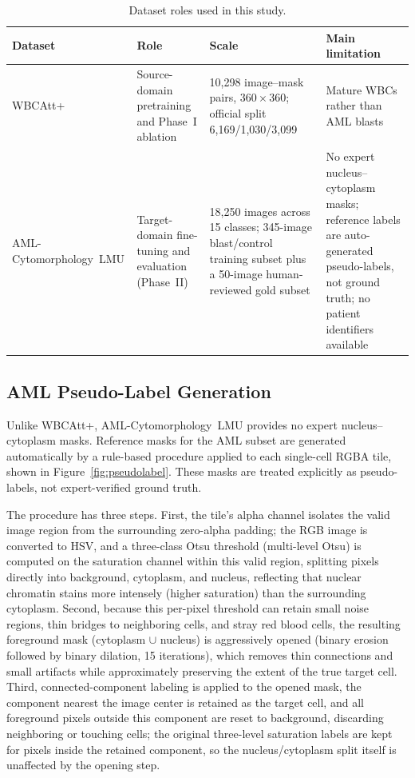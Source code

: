 \documentclass[pdflatex,sn-mathphys-num]{sn-jnl}%
\theoremstyle{thmstyleone}%
\theoremstyle{thmstyletwo}%
\theoremstyle{thmstylethree}%
\begin{document}
\begin{table}[t]
\caption{Dataset roles used in this study.}
\label{tab:datasets}
\centering
\begin{tabular}{p{2.6cm}p{3.0cm}p{4.3cm}p{5.0cm}}
\toprule
Dataset & Role & Scale & Main limitation \\
\midrule
WBCAtt+ & Source-domain pretraining and Phase~I ablation & 10,298 image--mask pairs, $360\times360$; official split 6{,}169/1{,}030/3{,}099 & Mature WBCs rather than AML blasts \\
AML-Cytomorphology~LMU & Target-domain fine-tuning and evaluation (Phase~II) & 18,250 images across 15 classes; 345-image blast/control training subset plus a 50-image human-reviewed gold subset & No expert nucleus--cytoplasm masks; reference labels are auto-generated pseudo-labels, not ground truth; no patient identifiers available \\
\bottomrule
\end{tabular}
\end{table}

\subsection{AML Pseudo-Label Generation}
\label{sec:pseudolabel}

Unlike WBCAtt+, AML-Cytomorphology~LMU provides no expert nucleus--cytoplasm masks. Reference masks for the AML subset are generated automatically by a rule-based procedure applied to each single-cell RGBA tile, shown in Figure~\ref{fig:pseudolabel}. These masks are treated explicitly as pseudo-labels, not expert-verified ground truth.

The procedure has three steps. First, the tile's alpha channel isolates the valid image region from the surrounding zero-alpha padding; the RGB image is converted to HSV, and a three-class Otsu threshold (multi-level Otsu) is computed on the saturation channel within this valid region, splitting pixels directly into background, cytoplasm, and nucleus, reflecting that nuclear chromatin stains more intensely (higher saturation) than the surrounding cytoplasm. Second, because this per-pixel threshold can retain small noise regions, thin bridges to neighboring cells, and stray red blood cells, the resulting foreground mask (cytoplasm $\cup$ nucleus) is aggressively opened (binary erosion followed by binary dilation, 15 iterations), which removes thin connections and small artifacts while approximately preserving the extent of the true target cell. Third, connected-component labeling is applied to the opened mask, the component nearest the image center is retained as the target cell, and all foreground pixels outside this component are reset to background, discarding neighboring or touching cells; the original three-level saturation labels are kept for pixels inside the retained component, so the nucleus/cytoplasm split itself is unaffected by the opening step.
\end{document}
